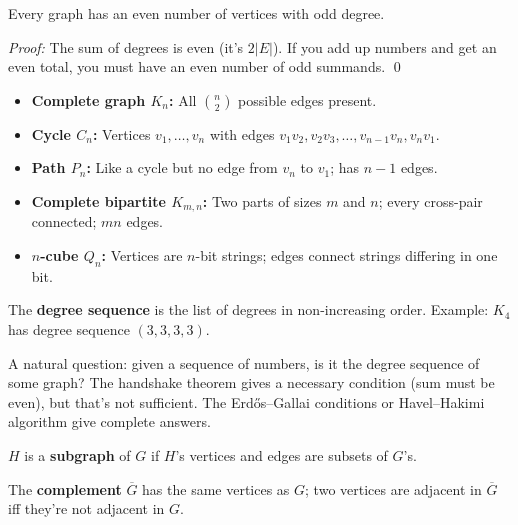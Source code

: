 \begin{corollary}
Every graph has an even number of vertices with odd degree.
\end{corollary}

\emph{Proof:} The sum of degrees is even (it's $2|E|$). If you add up numbers and get an even total, you must have an even number of odd summands. \qed

\begin{definition}
\begin{itemize}
  \item \textbf{Complete graph $K_n$:} All $\binom{n}{2}$ possible edges present.
  \item \textbf{Cycle $C_n$:} Vertices $v_1, \ldots, v_n$ with edges $v_1v_2, v_2v_3, \ldots, v_{n-1}v_n, v_nv_1$.
  \item \textbf{Path $P_n$:} Like a cycle but no edge from $v_n$ to $v_1$; has $n-1$ edges.
  \item \textbf{Complete bipartite $K_{m,n}$:} Two parts of sizes $m$ and $n$; every cross-pair connected; $mn$ edges.
  \item \textbf{$n$-cube $Q_n$:} Vertices are $n$-bit strings; edges connect strings differing in one bit.
\end{itemize}
\end{definition}

\begin{definition}
The \textbf{degree sequence} is the list of degrees in non-increasing order. Example: $K_4$ has degree sequence $(3, 3, 3, 3)$.
\end{definition}

A natural question: given a sequence of numbers, is it the degree sequence of some graph? The handshake theorem gives a necessary condition (sum must be even), but that's not sufficient. The Erdős--Gallai conditions or Havel--Hakimi algorithm give complete answers.

\begin{definition}
$H$ is a \textbf{subgraph} of $G$ if $H$'s vertices and edges are subsets of $G$'s.

The \textbf{complement} $\overline{G}$ has the same vertices as $G$; two vertices are adjacent in $\overline{G}$ iff they're not adjacent in $G$.
\end{definition}

